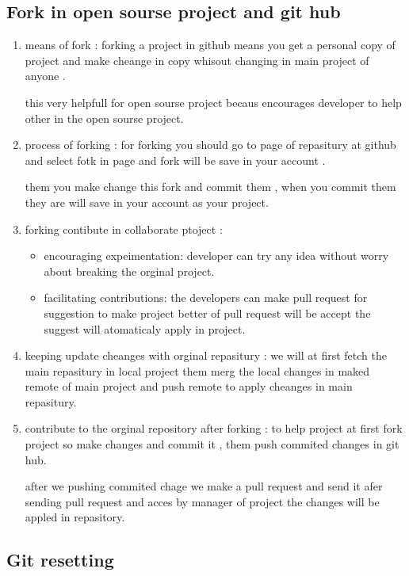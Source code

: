 \documentclass{article}
\begin{document}
\subsection*{Fork in open sourse project and git hub}
\begin{enumerate}
    \item means of fork :
    forking a project in github means you get a personal copy of project and make cheange in copy whisout changing in main project of anyone .

    this very helpfull  for open sourse project becaus encourages developer to help other in the open sourse project.
    
    \item process of forking :
    for forking you should go to page of repasitury at github and select fotk in page and fork will be save in your account .

    them you make change this fork and commit them , when you commit them they are will save in your account as your project.
    
    \item forking contibute in collaborate ptoject :
    \begin{itemize}
        \item encouraging expeimentation:
        developer can try any idea without worry about breaking the orginal project. 
        \item facilitating contributions:
        the developers can make pull request for suggestion to make project better of pull request will be accept the suggest will atomaticaly apply in project.

    \end{itemize}
    \item keeping update cheanges with orginal repasitury :
    we will at first fetch the main repasitury in local project them merg 
    the local changes in maked remote of main project and push remote to apply cheanges in main repasitury.
    \item contribute to the orginal repository after forking :
    to help project at first fork project so make changes and commit it ,
    them push commited changes in git hub.

    after we pushing commited chage we make a pull request and send it afer sending pull request and acces by manager of project the changes will be appled in repasitory.
    
\end{enumerate}
\subsection*{Git resetting}
\end{document}
